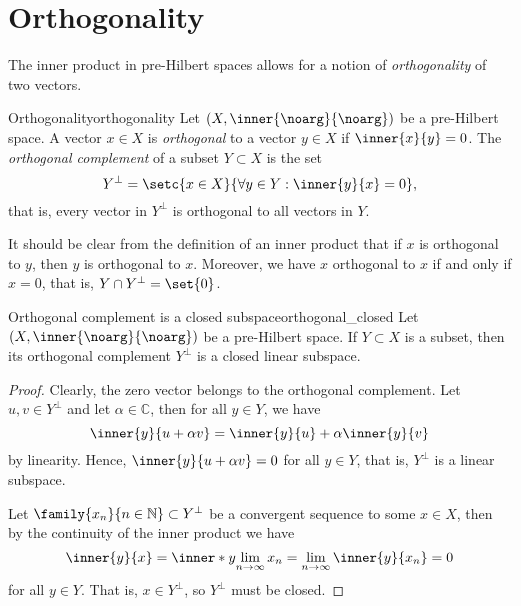 \section{Orthogonality}
The inner product in pre-Hilbert spaces allows for a notion of \emph{orthogonality} of two vectors.
\begin{definition}{Orthogonality}{orthogonality}
    Let \((X, \inner{\noarg}{\noarg})\) be a pre-Hilbert space. A vector \(x \in X\) is \emph{orthogonal} to a vector \(y \in X\) if \(\inner{x}{y} = 0\). The \emph{orthogonal complement} of a subset \(Y \subset X\) is the set
    \begin{equation*}
        Y^\perp = \setc{x \in X}{\forall y \in Y : \inner{y}{x} = 0},
    \end{equation*}
    that is, every vector in \(Y^\perp\) is orthogonal to all vectors in \(Y\).
\end{definition}
\begin{remark}
    It should be clear from the definition of an inner product that if \(x\) is orthogonal to \(y\), then \(y\) is orthogonal to \(x\). Moreover, we have \(x\) orthogonal to \(x\) if and only if \(x = 0\), that is, \(Y \cap Y^\perp = \set{0}\).
\end{remark}

\begin{proposition}{Orthogonal complement is a closed subspace}{orthogonal_closed}
    Let \((X, \inner{\noarg}{\noarg})\) be a pre-Hilbert space. If \(Y \subset X\) is a subset, then its orthogonal complement \(Y^\perp\) is a closed linear subspace.
\end{proposition}
\begin{proof}
    Clearly, the zero vector belongs to the orthogonal complement. Let \(u, v \in Y^\perp\) and let \(\alpha \in \mathbb{C}\), then for all \(y \in Y\), we have
    \begin{equation*}
        \inner{y}{u + \alpha v} = \inner{y}{u} + \alpha\inner{y}{v}
    \end{equation*}
    by linearity. Hence, \(\inner{y}{u + \alpha v} = 0\) for all \(y \in Y\), that is, \(Y^\perp\) is a linear subspace.

    Let \(\family{x_n}{n\in \mathbb{N}} \subset Y^\perp\) be a convergent sequence to some \(x \in X\), then by the continuity of the inner product we have
    \begin{equation*}
        \inner{y}{x} = \inner*{y}{\lim_{n\to\infty} x_n} = \lim_{n\to\infty} \inner{y}{x_n} = 0
    \end{equation*}
    for all \(y \in Y\). That is, \(x \in Y^\perp\), so \(Y^\perp\) must be closed.
\end{proof}


